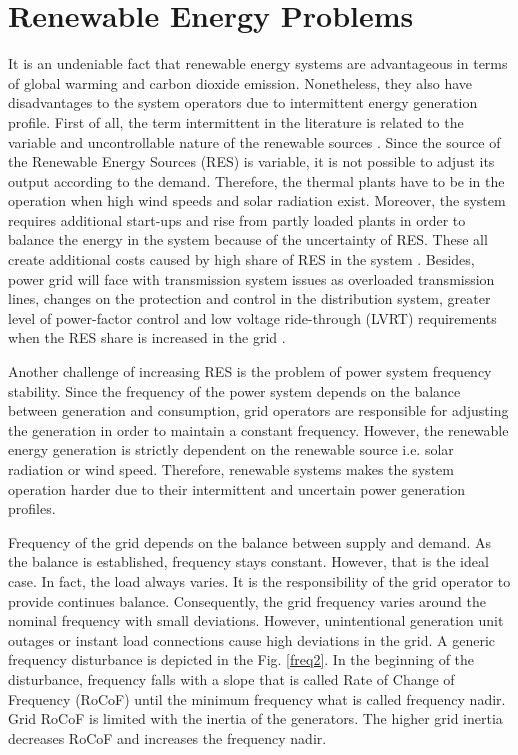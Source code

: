 \section{Renewable Energy Problems}
It is an undeniable fact that renewable energy systems are advantageous in terms of global warming and carbon dioxide emission. Nonetheless, they also have disadvantages to the system operators due to intermittent energy generation profile. First of all, the term intermittent in the literature is related to the variable and uncontrollable nature of the renewable sources \cite{KlingeJacobsen2010}. Since the source of the Renewable Energy Sources (RES) is variable, it is not possible to adjust its output according to the demand. Therefore, the thermal plants have to be in the operation when high wind speeds and solar radiation exist. Moreover, the system requires additional start-ups and rise from partly loaded plants in order to balance the energy in the system because of the uncertainty of RES. These all create additional costs caused by high share of RES in the system \cite{Zipf2013}. Besides, power grid will face with transmission system issues as overloaded transmission lines, changes on the protection and control in the distribution system, greater level of power-factor control and low voltage ride-through (LVRT) requirements when the RES share is increased in the grid \cite{Ipakchi2009}.\par
Another challenge of increasing RES is the problem of power system frequency stability. Since the frequency of the power system depends on the balance between generation and consumption, grid operators are responsible for adjusting the generation in order to maintain a constant frequency. However, the renewable energy generation is strictly dependent on the renewable source i.e. solar radiation or wind speed. Therefore, renewable systems makes the system operation harder due to their intermittent and uncertain power generation profiles. \par 
Frequency of the grid depends on the balance between supply and demand. As the balance is established, frequency stays constant. However, that is the ideal case. In fact, the load always varies. 
It is the responsibility of the grid operator to provide continues balance. Consequently, the grid frequency varies around the nominal frequency with small deviations. However, unintentional generation unit outages or instant load connections cause high deviations in the grid. A generic frequency disturbance is depicted in the Fig. \ref{freq2}. In the beginning of the disturbance, frequency falls with a slope that is called Rate of Change of Frequency (RoCoF) until the minimum frequency what is called frequency nadir. Grid RoCoF is limited with the inertia of the generators. The higher grid inertia decreases RoCoF and increases the frequency nadir. \par
